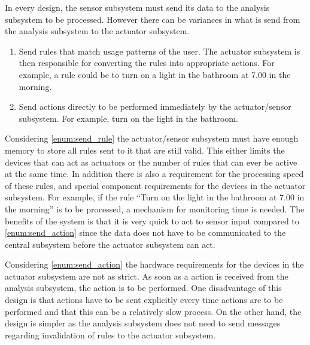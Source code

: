 In every design, the sensor subsystem must send its data to the analysis
subsystem to be processed. However there can be variances in what is send from
the analysis subsystem to the actuator subsystem.

\begin{enumerate}
\item \label{enum:send_rule} Send rules that match usage patterns of the user.
The actuator subsystem is then responsible for converting the rules into
appropriate actions. For example, a rule could be to turn on a light in the
bathroom at 7.00 in the morning.
\item \label{enum:send_action} Send actions directly to be performed immediately
by the actuator/sensor subsystem. For example, turn on the light in the bathroom.
\end{enumerate}

Considering \cref{enum:send_rule} the actuator/sensor subsystem must have enough memory
to store all rules sent to it that are still valid. This either limits the
devices that can act as actuators or the number of rules that can ever be active
at the same time. In addition there is also a requirement for the processing
speed of these rules, and special component requirements for the devices in the
actuator subsystem. For example, if the rule \enquote{Turn on the light in the
bathroom at 7.00 in the morning} is to be processed, a mechanism for monitoring
time is needed. The benefits of the system is that it is very quick to act to sensor input compared to \cref{enum:send_action} since the data does not have to be communicated to the central subsystem before the actuator subsystem can act.

Considering \cref{enum:send_action} the hardware requirements for the devices in
the actuator subsystem are not as strict. As soon as a action is received from
the analysis subsystem, the action is to be performed. One disadvantage of this
design is that actions have to be sent explicitly every time actions are to be
performed and that this can be a relatively slow process. On the other hand, the design is simpler as the analysis subsystem
does not need to send messages regarding invalidation of rules to the actuator
subsystem.


